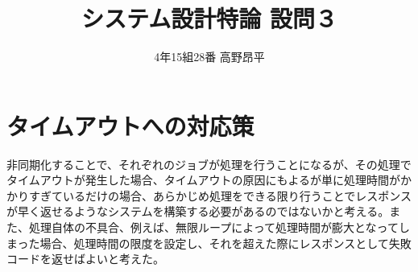 \documentclass{jsarticle}
\title{システム設計特論 設問３}
\author{4年15組28番  高野昂平}
\date{}
\begin{document}
\maketitle
\section*{タイムアウトへの対応策}
非同期化することで、それぞれのジョブが処理を行うことになるが、その処理でタイムアウトが発生した場合、タイムアウトの原因にもよるが単に処理時間がかかりすぎているだけの場合、あらかじめ処理をできる限り行うことでレスポンスが早く返せるようなシステムを構築する必要があるのではないかと考える。また、処理自体の不具合、例えば、無限ループによって処理時間が膨大となってしまった場合、処理時間の限度を設定し、それを超えた際にレスポンスとして失敗コードを返せばよいと考えた。
\end{document}
